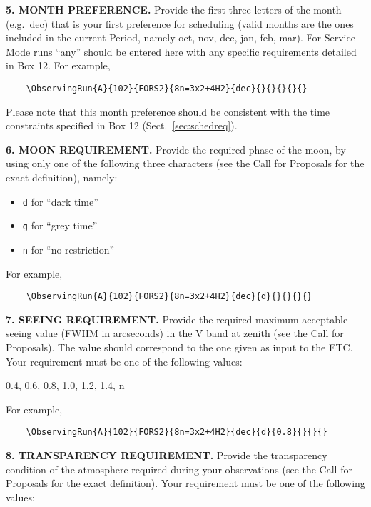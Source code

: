 \documentclass{article}
\begin{document}
\medskip

{\bf 5. MONTH PREFERENCE.} Provide the first three letters of the
month (e.g.\ dec) that is your first preference for
scheduling (valid months are the ones included in the current Period,
namely oct, nov, dec, jan,
feb, mar).
For Service Mode runs ``any'' should be entered here with any specific 
requirements detailed in Box 12. 
For example,
\begin{verbatim}
    \ObservingRun{A}{102}{FORS2}{8n=3x2+4H2}{dec}{}{}{}{}{}
\end{verbatim}
Please note that this month preference should be consistent with the time
constraints specified in Box 12 (Sect.~\ref{sec:schedreq}).

\medskip

{\bf 6. MOON REQUIREMENT.} Provide the required phase of the moon, by
using only one of the following three characters (see the Call for
Proposals for the exact definition), namely:
\begin{itemize}
\item {\tt d} for ``dark time''
\item {\tt g} for ``grey time''
\item {\tt n} for ``no restriction''
\end{itemize}
For example,
\begin{verbatim}
    \ObservingRun{A}{102}{FORS2}{8n=3x2+4H2}{dec}{d}{}{}{}{}
\end{verbatim}

\medskip

{\bf 7. SEEING REQUIREMENT.} Provide the required maximum acceptable seeing value (FWHM in arcseconds) in the V band at zenith (see the Call for Proposals). The value should correspond to the one given as input to the ETC.  Your requirement must be one of the following values:

\smallskip

0.4, 0.6, 0.8, 1.0, 1.2, 1.4, n

\smallskip

For example,
\begin{verbatim}
    \ObservingRun{A}{102}{FORS2}{8n=3x2+4H2}{dec}{d}{0.8}{}{}{}
\end{verbatim}

\medskip

{\bf 8. TRANSPARENCY REQUIREMENT.} Provide the transparency
condition of the atmosphere required during your observations (see the
Call for Proposals for the exact definition). Your requirement must
be one of the following values:
\end{document}
